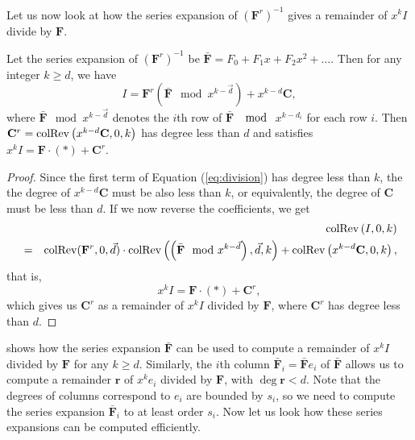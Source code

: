Let us now look at how the series expansion of $\left(\mathbf{F}^{r}\right)^{-1}$
gives a remainder of $x^{k}I$ divide by $\mathbf{F}$.
\begin{lem}
\label{lem:remainder}Let \textup{the series expansion of $\left(\mathbf{F}^{r}\right)^{-1}$
be }$\bar{\mathbf{F}}=F_{0}+F_{1}x+F_{2}x^{2}+\dots$. Then for any
integer $k\ge d$, we have 
\begin{equation}
I=\mathbf{F}^{r}\left(\bar{\mathbf{F}}\mod x^{k-\vec{d}}\right)+x^{k-d}\mathbf{C},\label{eq:division}
\end{equation}
where $\bar{\mathbf{F}}\mod x^{k-\vec{d}}$ denotes the $i$th row
of $\bar{\mathbf{F}}$ $\mod$ $x^{k-d_{i}}$ for each row $i$. Then
$\mathbf{C}^{r}=\operatorname{colRev}\left(x^{k-d}\mathbf{C},0,k\right)$ has degree
less than $d$ and satisfies \textup{$x^{k}I=\mathbf{F}\cdot\left(*\right)+\mathbf{C}^{r}$.}\end{lem}
\begin{proof}
Since the first term of Equation (\ref{eq:division}) has degree less
than $k$, the the degree of $x^{k-d}\mathbf{C}$ must be also less
than $k$, or equivalently, the degree of $\mathbf{C}$ must be less
than $d$. If we now reverse the coefficients, we get 
\begin{eqnarray*}
 &  & \operatorname{colRev}\left(I,0,k\right)\\
 & = & \operatorname{colRev}(\mathbf{F}^{r},0,\vec{d})\cdot\operatorname{colRev}\left(\left(\bar{\mathbf{F}}\mod x^{k-\vec{d}}\right),\vec{d},k\right)+\operatorname{colRev}\left(x^{k-d}\mathbf{C},0,k\right),
\end{eqnarray*}
 that is, 
\[
x^{k}I=\mathbf{F}\cdot\left(*\right)+\mathbf{C}^{r},
\]
 which gives us $\mathbf{C}^{r}$ as a remainder of $x^{k}I$ divided
by $\mathbf{F}$, where $\mathbf{C}^{r}$ has degree less than $d$. 
\end{proof}
 shows how the series expansion $\bar{\mathbf{F}}$
can be used to compute a remainder of $x^{k}I$ divided by $\mathbf{F}$
for any $k\ge d$. Similarly, the $i$th column $\bar{\mathbf{F}}_{i}=\bar{\mathbf{F}}e_{i}$
of $\bar{\mathbf{F}}$ allows us to compute a remainder $\mathbf{r}$
of $x^{k}e_{i}$ divided by $\mathbf{F}$, with $\deg\mathbf{r}<d$.
Note that the degrees of columns correspond to $e_{i}$ are bounded
by $s_{i}$, so we need to compute the series expansion $\bar{\mathbf{F}}_{i}$
to at least order $s_{i}$. Now let us look how these series expansions
can be computed efficiently.


